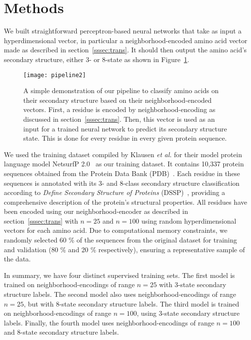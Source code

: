 \section{Methods}
We built straightforward perceptron-based neural networks that take as input a hyperdimensional vector, in particular a neighborhood-encoded amino acid vector made as described in section~\ref{sssec:trans}. It should then output the amino acid's secondary structure, either 3- or 8-state as shown in Figure~\ref{fig:pipe2}.

\begin{figure}[H]
    \centering
    \texttt{[image: pipeline2]}
    \caption{A simple demonstration of our pipeline to classify amino acids on their secondary structure based on their neighborhood-encoded vectors. First, a residue is encoded by neighborhood-encoding as discussed in section~\ref{sssec:trans}. Then, this vector is used as an input for a trained neural network to predict its secondary structure state. This is done for every residue in every given protein sequence.}\label{fig:pipe2}
\end{figure}

We used the training dataset compiled by Klausen \textit{et al.} for their model protein language model NetsurfP 2.0~\cite{netsurf} as our training dataset. It contains 10,337 protein sequences obtained from the Protein Data Bank (PDB)~\cite{pdb}. Each residue in these sequences is annotated with its 3- and 8-class secondary structure classification according to \textit{Define Secondary Structure of Proteins} (DSSP)~\cite{dssp}, providing a comprehensive description of the protein's structural properties. All residues have been encoded using our neighborhood-encoder as described in section~\ref{sssec:trans} with $n=25$ and $n=100$ using random hyperdimensional vectors for each amino acid. Due to computational memory constraints, we randomly selected 60 \% of the sequences from the original dataset for training and validation (80 \% and 20 \% respectively), ensuring a representative sample of the data.

In summary, we have four distinct supervised training sets. The first model is trained on neighborhood-encodings of range $n=25$ with 3-state secondary structure labels. The second model also uses neighborhood-encodings of range $n=25$, but with 8-state secondary structure labels. The third model is trained on neighborhood-encodings of range $n=100$, using 3-state secondary structure labels. Finally, the fourth model uses neighborhood-encodings of range $n=100$ and 8-state secondary structure labels.

